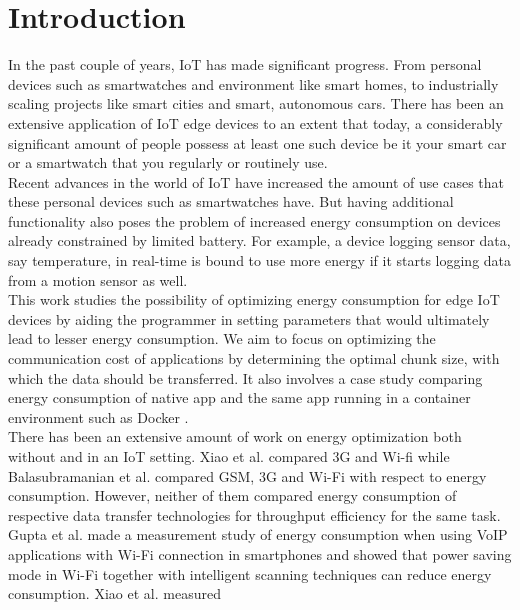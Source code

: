 
\chapter{Introduction}\label{ch:chapter1}

In the past couple of years, IoT has made significant progress. From personal devices 
such as smartwatches and environment like smart homes, to industrially scaling projects 
like smart cities and smart, autonomous cars. There has been an extensive application of 
IoT edge devices to an extent that today, a considerably significant amount of people possess 
at least one such device \textemdash be it your smart car or a smartwatch that you regularly 
or routinely use. \\
Recent advances in the world of IoT have increased the amount of use cases that these 
personal devices such as smartwatches have. But having additional functionality also poses 
the problem of increased energy consumption on devices already constrained by limited battery. 
For example, a device logging sensor data, say temperature, in real-time is bound to use 
more energy if it starts logging data from a motion sensor as well. \\
This work studies the possibility of optimizing energy consumption for edge IoT devices 
by aiding the programmer in setting parameters that would ultimately lead to lesser energy 
consumption. We aim to focus on optimizing the communication cost of applications by determining 
the optimal chunk size, with which the data should be transferred. It also involves a case study 
comparing energy consumption of native app and the same app running in a container environment 
such as Docker \cite{turnbull_2014}. \\
There has been an extensive amount of work on energy optimization \textemdash both without 
and in an IoT setting. Xiao et al. \cite{4756414} compared 3G and Wi-fi while Balasubramanian 
et al. \cite{confbal} compared GSM, 3G and Wi-Fi with respect to energy consumption. However, 
neither of them compared energy consumption of respective data transfer technologies 
for throughput efficiency for the same task. \\
Gupta et al. \cite{4292824} made a measurement study of energy consumption when using VoIP applications 
with Wi-Fi connection in smartphones and showed that power saving mode in Wi-Fi together with 
intelligent scanning techniques can reduce energy consumption. Xiao et al. \cite{4756414} measured 
